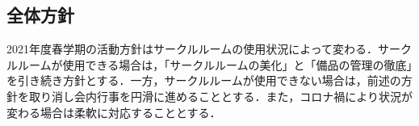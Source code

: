 \subsection*{全体方針}


2021年度春学期の活動方針はサークルルームの使用状況によって変わる．サークルルームが使用できる場合は，「サークルルームの美化」と「備品の管理の徹底」を引き続き方針とする．一方，サークルルームが使用できない場合は，前述の方針を取り消し会内行事を円滑に進めることとする．また，コロナ禍により状況が変わる場合は柔軟に対応することとする．
